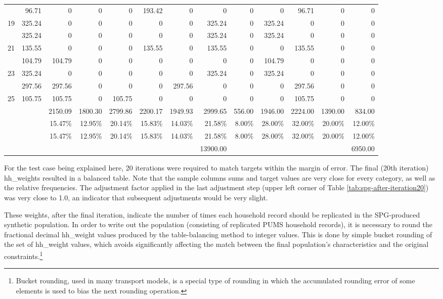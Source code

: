 \begin{sidewaystable}
\begin{tabular}{c*{12}{r}}
\gray 18 & 96.71 & 0 & 0 & 0 & 193.42 & 0 & 0 & 0 & 0 & 96.71 & 0 & 0 \\
19 & 325.24 & 0 & 0 & 0 & 0 & 0 & 325.24 & 0 & 325.24 & 0 & 0 & 0 \\
\gray 20 & 325.24 & 0 & 0 & 0 & 0 & 0 & 325.24 & 0 & 325.24 & 0 & 0 & 0 \\
21 & 135.55 & 0 & 0 & 0 & 135.55 & 0 & 135.55 & 0 & 0 & 135.55 & 0 & 0 \\
\gray 22 & 104.79 & 104.79 & 0 & 0 & 0 & 0 & 0 & 0 & 104.79 & 0 & 0 & 0 \\
23 & 325.24 & 0 & 0 & 0 & 0 & 0 & 325.24 & 0 & 325.24 & 0 & 0 & 0 \\
\gray 24 & 297.56 & 297.56 & 0 & 0 & 0 & 297.56 & 0 & 0 & 0 & 297.56 & 0 & 0 \\
25 & 105.75 & 105.75 & 0 & 105.75 & 0 & 0 & 0 & 0 & 0 & 105.75 & 0 & 0 \\
\hline
 &  & 2150.09 & 1800.30 & 2799.86 & 2200.17 & 1949.93 & 2999.65 & 556.00 & 1946.00 & 2224.00 & 1390.00 & 834.00 \\
 &  & 15.47\% & 12.95\% & 20.14\% & 15.83\% & 14.03\% & 21.58\% & 8.00\% & 28.00\% & 32.00\% & 20.00\% & 12.00\% \\
\rowcolor{yellow!10} \cellcolor{white} & \cellcolor{white} & 15.47\% & 12.95\% & 20.14\% & 15.83\% & 14.03\% & 21.58\% & 8.00\% & 28.00\% & 32.00\% & 20.00\% & 12.00\% \\
 &  &  &  &  &  &  & 13900.00 &  &  &  &  & 6950.00 \\
\hline
\end{tabular}
\end{sidewaystable}

For the test case being explained here, 20 iterations were required to match targets within the margin of error. The final (20th iteration) hh\_weights resulted in a balanced table. Note that the sample columns sums and target values are very close for every category, as well as the relative frequencies. The adjustment factor applied in the last adjustment step (upper left corner of Table \ref{tab:spg-after-iteration20}) was very close to 1.0, an indicator that subsequent adjustments would be very slight.

These weights, after the final iteration, indicate the number of times each household record should be replicated in the SPG-produced synthetic population. In order to write out the population (consisting of replicated PUMS household records), it is necessary to round the fractional decimal hh\_weight values produced by the table-balancing method to integer values. This is done by simple bucket rounding of the set of hh\_weight values, which avoids significantly affecting the match between the final population's characteristics and the original constraints.\footnote{Bucket rounding, used in many transport models, is a special type of rounding in which the accumulated rounding error of some elements is used to bias the next rounding operation.}

